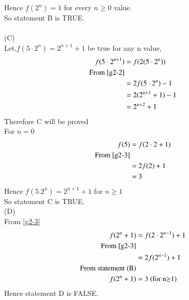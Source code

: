 \documentclass[journal,12pt,twocolumn]{IEEEtran}
\theoremstyle{remark}
\begin{document}
Hence $f(2^n)=1$ for every $n\geq0$ value.\\
So statement B is TRUE.\\
\\(C)\\
Let,$f(5\cdot2^n)=2^{n+1}+1$ be true for any n value,
\begin{align}
        f(5\cdot2^{n+1})&=f(2(5\cdot2^n))\\
	\text{From \eqref{g2-2}}\\
        &=2f(5\cdot2^n)-1\\
        &=2(2^{n+1}+1)-1\\
        &=2^{n+2}+1
\end{align}
Therefore C will be proved\\
For $n=0$
\begin{align}
	f(5)&=f(2\cdot2+1)\\
	 \notag\text{From \eqref{g2-3}}\\
        &=2f(2)+1\\
        &=3
\end{align}
Hence $f(5.2^n)=2^{n+1}+1$ for $n\geq1$\\
So statement C is TRUE.\\
(D)\\
From \eqref{g2-3}
\begin{align}
	f(2^n+1)&=f(2\cdot2^{n-1})+1\\
	\notag\text{From \eqref{g2-3}}\\
	&=2f(2^{n-1})+1\\
	\notag\text{From statement (B)}\\
	f(2^n+1)&=3\text{  (for n$\geq$1})
\end{align}
Hence statement D is FALSE.
\end{document}
